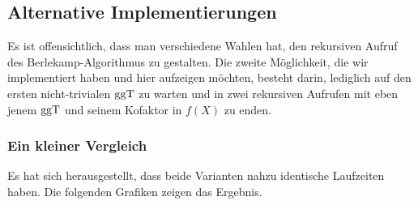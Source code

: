 \subsection{Alternative Implementierungen}

Es ist offensichtlich, dass man verschiedene Wahlen hat, den rekursiven Aufruf
des Berlekamp-Algorithmus zu gestalten. Die zweite Möglichkeit, die wir
implementiert haben und hier aufzeigen möchten, besteht darin, lediglich auf
den ersten nicht-trivialen $\operatorname{ggT}$ zu warten und in zwei rekursiven Aufrufen mit
eben jenem $\operatorname{ggT}$ und seinem Kofaktor in $f(X)$ zu enden.


\subsubsection{Ein kleiner Vergleich}

Es hat sich herausgestellt, dass beide Varianten nahzu identische Laufzeiten
haben. Die folgenden Grafiken zeigen das Ergebnis.
